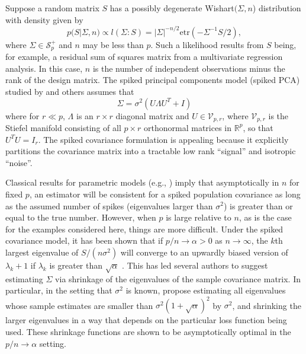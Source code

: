 \documentclass{statsoc}
\newcommand{\bl}[1]{{\mathbf #1}}
\newcommand{\etr}{\text{etr}}
\begin{document}
Suppose a random matrix $S$ has a possibly degenerate Wishart$(\Sigma,n$)
distribution with density given by
\begin{equation} 
p(S | \Sigma, n) \propto l(\Sigma: S) =  |\Sigma|^{-n/2} \text{etr}( - \Sigma^{-1}  S/2 ) ,  
\label{eqn:lik}
\end{equation}
%
\noindent where $\Sigma \in \mathcal S_p^+$ and $n$ may be less than $p$.  Such
a likelihood results from $S$ being, for example, a residual sum
of squares matrix from a multivariate regression analysis. In this
case, $n$ is the number of independent observations minus the rank of
the design matrix.  The spiked principal components model (spiked PCA)
studied by \citet{Johnstone2001} and others assumes that
\begin{equation} 
\Sigma = \sigma^2 ( U  \Lambda  U^T  + I )
\label{eqn:spiked}
\end{equation}
%
\noindent where for $r \ll p$, $\Lambda$ is an $r\times r$ diagonal
matrix and $U \in \mathcal V_{p,r}$, where $\mathcal V_{p,r}$ is the
Stiefel manifold consisting of all $p \times r$ orthonormal matrices in $\mathbb{R}^p$, so that
$U^TU = I_r$.  The spiked covariance formulation is appealing because it
explicitly partitions the covariance matrix into a tractable low rank
``signal'' and isotropic ``noise''.


Classical results for parametric models (e.g., \citet{Schwartz1965})
imply that asymptotically in $n$ for fixed $p$, an estimator will be
consistent for a spiked population covariance as long as the assumed
number of spikes (eigenvalues larger than $\sigma^2$) is greater than
or equal to the true number.  However, when $p$ is large relative to
$n$, as is the case for the examples considered here, things are more
difficult.  Under the spiked covariance model, it has been shown that
if $p/n \rightarrow \alpha >0$ as $n\rightarrow \infty$, the $k$th
largest eigenvalue of $S/(n\sigma^2)$ will converge to an upwardly
biased version of $\lambda_{k}+1$ if $\lambda_k$ is greater than
$\sqrt{\alpha}$ \citep{Baik2006, Paul2007}.  This has led several
authors to suggest estimating $\Sigma$ via shrinkage of the
eigenvalues of the sample covariance matrix. In particular, in the
setting that $\sigma^2$ is known, \citet{Donoho2013} propose
estimating all eigenvalues whose sample estimates are smaller than
$\sigma^2(1+\sqrt{\alpha})^2$ by $\sigma^2$, and shrinking the larger
eigenvalues in a way that depends on the particular loss function
being used.  These shrinkage functions are shown to be asymptotically
optimal in the $p/n\rightarrow \alpha$ setting.  
\end{document}
